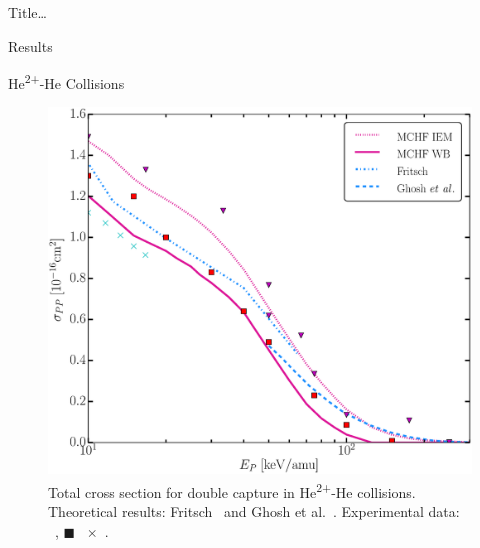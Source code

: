 \documentclass[letterpaper, 11 pt]{report}
\begin{document}
\begin{chapter}{ Title\dots \label{chap:p-he2p-he}}
\begin{section}{Results \label{sec:phe2p-res}}
\begin{subsection}{\texorpdfstring{He\textsuperscript{2+}}{He2+}-He Collisions 
                         \label{sec:he2phe-res}}
         \begin{figure}[htp]
            \centering
            \includegraphics[width = 0.49\linewidth]{./images/he2phe/he2phe-PP.eps}
            \caption[Total cross section for double capture in He\textsuperscript{2+}-He
                     collisions.]{Total cross section for double capture in He\textsuperscript{2+}-He
                     collisions.
                     Theoretical results: Fritsch~\cite{Fritsch-94} and Ghosh
                     et al.~\cite{GDMP-08}.
                     Experimental data: {\color{RedViolet}{$\blacktriangledown$}}~\cite{Dubois87},
                     {\color{red}$\blacksquare$}~\cite{Rudd85}
                     {\color{TealBlue}$\times$}~\cite{SG74}. \label{fig:he2phe-pp}}
         \end{figure}


\end{subsection}
\end{section}
\end{chapter}
\end{document}
